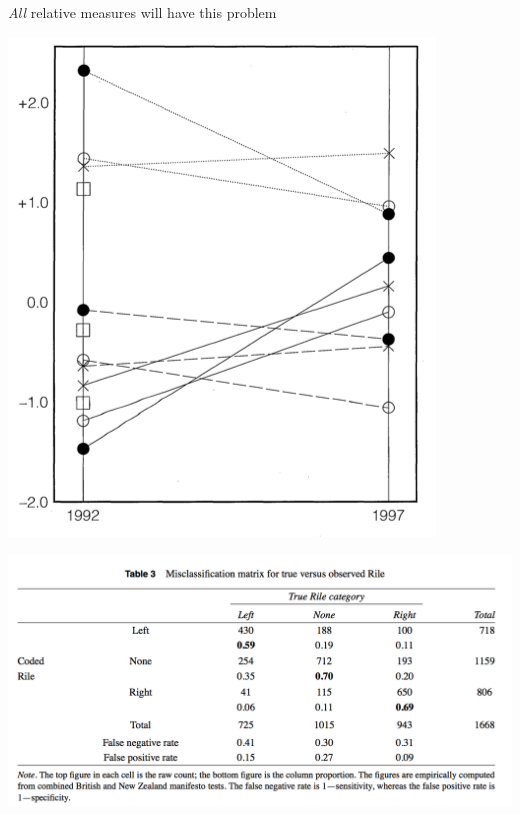 \documentclass[11pt,compress,professionalfonts]{beamer}
\begin{document}
\textit{All} relative measures will have this problem



 

\centerline{\includegraphics[scale=.7]{pictures/lg-shrinkage}}
 
 

\centerline{\includegraphics[scale=.9]{pictures/slava-rile3}}

\end{document}
